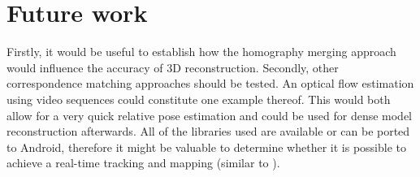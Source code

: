 \section{Future work}
Firstly, it would be useful to establish how the homography merging approach would influence the accuracy of 3D reconstruction. Secondly, 
 other correspondence matching approaches should be tested. An optical flow estimation using video sequences could constitute one example thereof. This would both allow for a very quick relative pose estimation and could be used for dense model reconstruction afterwards. All of the libraries used are available or can be ported to Android, therefore it might be valuable to determine whether it is possible to achieve a real-time tracking and mapping (similar to \cite{ptam}).



